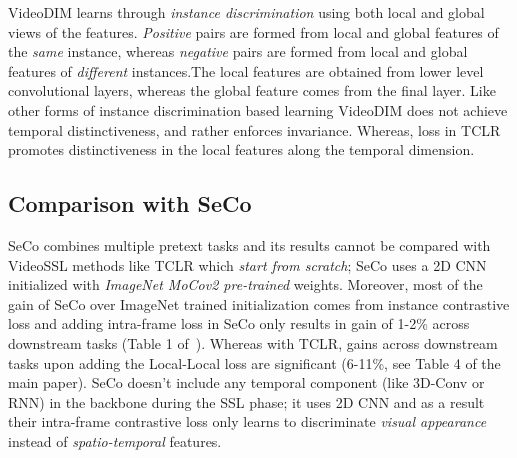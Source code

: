 \documentclass[10pt,twocolumn,letterpaper]{article}
\begin{document}
VideoDIM learns through \textit{instance discrimination} using both local and global views of the features. \textit{Positive} pairs are formed from local and global features of the \textit{same} instance, whereas \textit{negative} pairs are formed from local and global features of \textit{different} instances.The local features are obtained from lower level convolutional layers, whereas the global feature comes from the final layer. Like other forms of instance discrimination based learning VideoDIM does not achieve temporal distinctiveness, and rather enforces invariance. Whereas,  loss in TCLR promotes distinctiveness in the local features along the temporal dimension.

\subsection{Comparison with SeCo~\cite{seco}}

SeCo combines multiple pretext tasks and its results cannot be compared with VideoSSL methods like TCLR which {\em start from scratch}; SeCo uses a 2D CNN initialized with \textit{ImageNet MoCov2 pre-trained} weights. Moreover, most of the gain of SeCo over ImageNet trained initialization comes from instance contrastive loss and adding intra-frame loss in SeCo only results in gain of 1-2\% across downstream tasks (Table 1 of~\cite{seco}). Whereas with TCLR, gains across downstream tasks upon adding the Local-Local loss are significant (6-11\%, see Table 4 of the main paper). SeCo doesn't include any temporal component (like 3D-Conv or RNN) in the backbone during the SSL phase; it uses 2D CNN and as a result their intra-frame contrastive loss only learns to discriminate \textit{visual appearance} instead of \textit{spatio-temporal} features.
\end{document}
